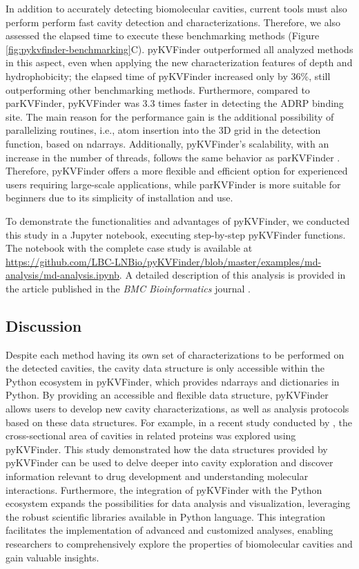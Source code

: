 \documentclass[Ingles]{phdthesis}
\def\ie{i.e.\onedot}
\begin{document}
In addition to accurately detecting biomolecular cavities, current tools must also perform perform fast cavity detection and characterizations. Therefore, we also assessed the elapsed time to execute these benchmarking methods (Figure \ref{fig:pykvfinder-benchmarking}C). pyKVFinder outperformed all analyzed methods in this aspect, even when applying the new characterization features of depth and hydrophobicity; the elapsed time of pyKVFinder increased only by 36\%, still outperforming other benchmarking methods. Furthermore, compared to parKVFinder, pyKVFinder was 3.3 times faster in detecting the ADRP binding site. The main reason for the performance gain is the additional possibility of parallelizing routines, \ie, atom insertion into the 3D grid in the detection function, based on ndarrays. Additionally, pyKVFinder's scalability, with an increase in the number of threads, follows the same behavior as parKVFinder \cite{guerra2020}. Therefore, pyKVFinder offers a more flexible and efficient option for experienced users requiring large-scale applications, while parKVFinder is more suitable for beginners due to its simplicity of installation and use.

To demonstrate the functionalities and advantages of pyKVFinder, we conducted this study in a Jupyter notebook, executing step-by-step pyKVFinder functions. The notebook with the complete case study is available at \url{https://github.com/LBC-LNBio/pyKVFinder/blob/master/examples/md-analysis/md-analysis.ipynb}. A detailed description of this analysis is provided in the article published in the \textit{BMC Bioinformatics} journal \cite{guerra2021}.

\subsection{Discussion}

Despite each method having its own set of characterizations to be performed on the detected cavities, the cavity data structure is only accessible within the Python ecosystem in pyKVFinder, which provides \acp{ndarray} and dictionaries in Python. By providing an accessible and flexible data structure, pyKVFinder allows users to develop new cavity characterizations, as well as analysis protocols based on these data structures. For example, in a recent study conducted by \cite{jefferson2023}, the cross-sectional area of cavities in related proteins was explored using pyKVFinder. This study demonstrated how the data structures provided by pyKVFinder can be used to delve deeper into cavity exploration and discover information relevant to drug development and understanding molecular interactions. Furthermore, the integration of pyKVFinder with the Python ecosystem expands the possibilities for data analysis and visualization, leveraging the robust scientific libraries available in Python language. This integration facilitates the implementation of advanced and customized analyses, enabling researchers to comprehensively explore the properties of biomolecular cavities and gain valuable insights.
\end{document}
